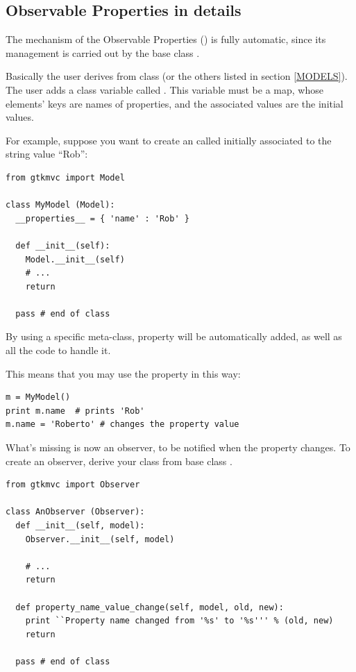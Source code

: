 \subsection{\label{OPD}Observable Properties in details}
The mechanism of the Observable Properties (\OP) is fully automatic,
since its management is carried out by the base class
.

Basically the user derives from class  (or the others
listed in section \ref{MODELS}). The user adds a class variable
called \OPvar. This variable must be a map, whose elements' keys are
names of properties, and the associated values are the initial values.

For example, suppose you want to create an \OP called  
initially associated to the string value ``Rob'':

{ \codesize 
\begin{verbatim} 
from gtkmvc import Model

class MyModel (Model):
  __properties__ = { 'name' : 'Rob' }

  def __init__(self):
    Model.__init__(self)
    # ...
    return

  pass # end of class
\end{verbatim}
}

By using a specific meta-class, property  will be
automatically added, as well as all the code to handle it.

This means that you may use the property in this way:
{ \codesize 
\begin{verbatim} 
m = MyModel()
print m.name  # prints 'Rob'
m.name = 'Roberto' # changes the property value
\end{verbatim}
}

What's missing is now an observer, to be notified when the property
changes. To create an observer, derive your class from base class
.

{ \codesize 
\begin{verbatim} 
from gtkmvc import Observer

class AnObserver (Observer):
  def __init__(self, model):
    Observer.__init__(self, model)

    # ...
    return

  def property_name_value_change(self, model, old, new):
    print ``Property name changed from '%s' to '%s''' % (old, new)
    return

  pass # end of class
\end{verbatim}
}

